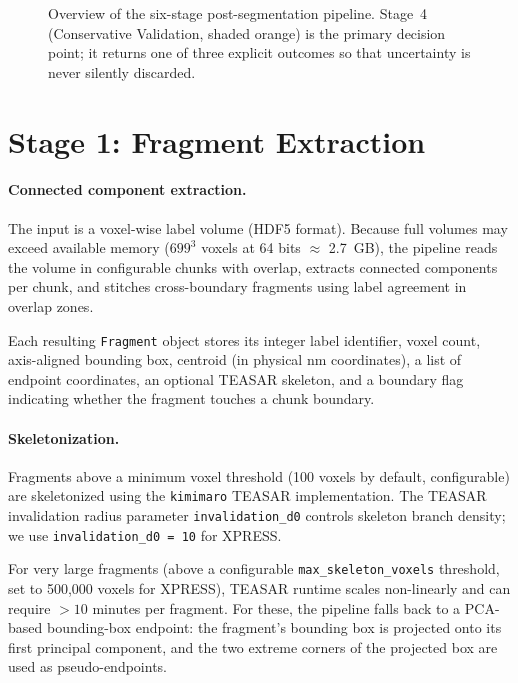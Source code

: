\begin{figure}[H]
\caption{Overview of the six-stage post-segmentation pipeline. Stage~4
(Conservative Validation, shaded orange) is the primary decision point; it
returns one of three explicit outcomes so that uncertainty is never silently
discarded.}
\label{fig:pipeline}
\end{figure}

\section{Stage 1: Fragment Extraction}

\paragraph{Connected component extraction.}
The input is a voxel-wise label volume (HDF5 format). Because full volumes
may exceed available memory ($699^3$ voxels at 64 bits $\approx$ 2.7~GB), the
pipeline reads the volume in configurable chunks with overlap, extracts
connected components per chunk, and stitches cross-boundary fragments using
label agreement in overlap zones.

Each resulting \texttt{Fragment} object stores its integer label identifier,
voxel count, axis-aligned bounding box, centroid (in physical nm coordinates),
a list of endpoint coordinates, an optional TEASAR skeleton, and a boundary flag
indicating whether the fragment touches a chunk boundary.

\paragraph{Skeletonization.}
Fragments above a minimum voxel threshold (100 voxels by default, configurable)
are skeletonized using the \texttt{kimimaro} TEASAR implementation. The TEASAR
invalidation radius parameter \texttt{invalidation\_d0} controls skeleton
branch density; we use \texttt{invalidation\_d0 = 10} for XPRESS.

For very large fragments (above a configurable \texttt{max\_skeleton\_voxels}
threshold, set to 500{,}000 voxels for XPRESS), TEASAR runtime scales
non-linearly and can require $>10$ minutes per fragment. For these, the pipeline
falls back to a PCA-based bounding-box endpoint: the fragment's bounding box
is projected onto its first principal component, and the two extreme corners
of the projected box are used as pseudo-endpoints.

